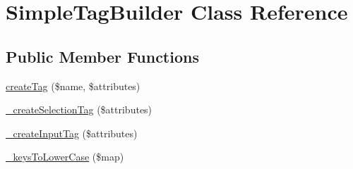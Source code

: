 \hypertarget{class_simple_tag_builder}{
\section{SimpleTagBuilder Class Reference}
\label{class_simple_tag_builder}
}
\subsection*{Public Member Functions}
\begin{DoxyCompactItemize}
\item 
\hyperlink{class_simple_tag_builder_a21fd84e5f34b51890d72d8a66d96fbf3}{createTag} (\$name, \$attributes)
\item 
\hyperlink{class_simple_tag_builder_aa370216e692feedf69ca7b5ace1804e1}{\_\-createSelectionTag} (\$attributes)
\item 
\hyperlink{class_simple_tag_builder_af5b0ee595950c591169a3b9a3f7f0d91}{\_\-createInputTag} (\$attributes)
\item 
\hyperlink{class_simple_tag_builder_af948b060e63eff87637beb993b35f072}{\_\-keysToLowerCase} (\$map)
\end{DoxyCompactItemize}


